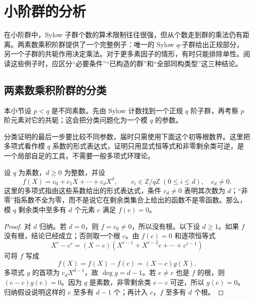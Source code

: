 
\section{小阶群的分析}
\label{b1:sec:0503}

在小阶群中，Sylow 子群个数的算术限制往往很强，但从个数走到群的乘法仍有距离。两素数乘积阶群提供了一个完整例子：唯一的 Sylow \(q\)-子群给出正规部分，另一个子群的共轭作用决定乘法。对于更多素因子的情形，有时只能排除单性。阅读这些例子时，应区分“必要条件”“已构造的群”和“全部同构类型”这三种结论。


%
%

\subsection{两素数乘积阶群的分类}
\label{b1:subsec:0503:01}

本小节设 \(p<q\) 是不同素数。先由 Sylow 计数找到一个正规 \(q\) 阶子群，再考察 \(p\) 阶元素对它的共轭；这会把分类问题化为一个模 \(q\) 的参数。

\ProseParagraphBreak
分类证明的最后一步要比较不同参数，届时只需使用下面这个初等根数界。这里把多项式看作模 \(q\) 系数的形式表达式，证明只用显式恒等式和非零剩余类可逆，是一个局部自足的工具，不需要一般多项式环理论。

\begin{lemma}[模素数的多项式根数界]\label{b1:lem:polynomial-root-bound-mod-prime}
	设 \(q\) 为素数，\(d\geq0\) 为整数，并设
	\[
		f(X)=c_0+c_1X+\cdots+c_dX^d, \qquad c_i\in\mathbb Z/q\mathbb Z\ (0\leq i\leq d),\quad c_d\neq0.
	\]
	这里的多项式指由这些系数给出的形式表达式，条件 \(c_d\neq0\) 表明其次数为 \(d\)；“非零”指系数不全为零，而不是说它在剩余类集合上给出的函数不是零函数。那么，模 \(q\) 剩余类中至多有 \(d\) 个元素 \(c\) 满足 \(f(c)=0\)。
\end{lemma}
\begin{proof}
	对 \(d\) 归纳。若 \(d=0\)，则 \(f=c_0\neq0\)，所以没有根。以下设 \(d\geq1\)。如果 \(f\) 没有根，结论已经成立；否则取一个根 \(c\)。由 \(f(c)=0\) 和逐项恒等式
	\[
		X^r-c^r=(X-c)(X^{r-1}+X^{r-2}c+\cdots+c^{r-1})
	\]
	可将 \(f\) 写成
	\[
		f(X)=f(X)-f(c)=(X-c)g(X).
	\]
	多项式 \(g\) 的首项为 \(c_dX^{d-1}\)，故 \(\deg g=d-1\)。若 \(e\neq c\) 也是 \(f\) 的根，则 \((e-c)g(e)=0\)。因为 \(q\) 是素数，非零剩余类 \(e-c\) 可逆，所以 \(g(e)=0\)。归纳假设说明这样的 \(e\) 至多有 \(d-1\) 个；再计入 \(c\)，\(f\) 至多有 \(d\) 个根。
\end{proof}

